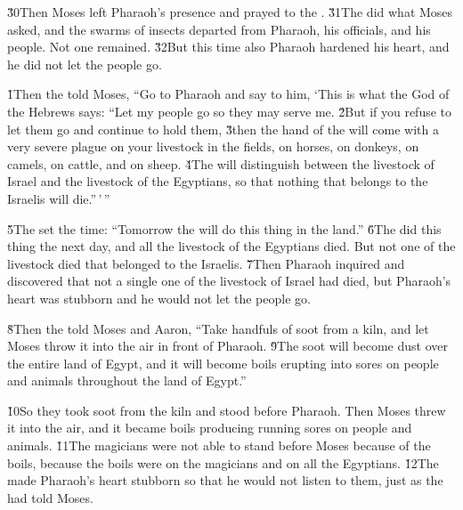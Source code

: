 \v{30}Then Moses left Pharaoh's presence and prayed to the . \v{31}The  did what Moses asked, and the swarms of insects departed from Pharaoh, his officials, and his people. Not one remained. \v{32}But this time also Pharaoh hardened his heart, and he did not let the people go.

\v{1}Then the  told Moses, ``Go to Pharaoh and say to him, `This is what the  God of the Hebrews says: ``Let my people go so they may serve me. \v{2}But if you refuse to let them go and continue to hold them, \v{3}then the hand of the  will come with a very severe plague on your livestock in the fields, on horses, on donkeys, on camels, on cattle, and on sheep. \v{4}The  will distinguish between the livestock of Israel and the livestock of the Egyptians, so that nothing that belongs to the Israelis will die.''\,'\,''

\v{5}The  set the time: ``Tomorrow the  will do this thing in the land.'' \v{6}The  did this thing the next day, and all the livestock of the Egyptians died. But not one of the livestock died that belonged to the Israelis. \v{7}Then Pharaoh inquired and discovered that not a single one of the livestock of Israel had died, but Pharaoh's heart was stubborn and he would not let the people go.

\v{8}Then the  told Moses and Aaron, ``Take handfuls of soot from a kiln, and let Moses throw it into the air in front of Pharaoh. \v{9}The soot will become dust over the entire land of Egypt, and it will become boils erupting into sores on people and animals throughout the land of Egypt.''

\v{10}So they took soot from the kiln and stood before Pharaoh. Then Moses threw it into the air, and it became boils producing running sores on people and animals. \v{11}The magicians were not able to stand before Moses because of the boils, because the boils were on the magicians and on all the Egyptians. \v{12}The  made Pharaoh's heart stubborn so that he would not listen to them, just as the  had told Moses.

